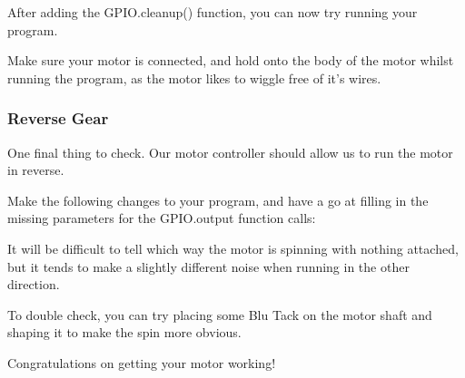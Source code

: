		
		
		After adding the GPIO.cleanup() function, you can now try running your program.
		
		Make sure your motor is connected, and hold onto the body of the motor whilst running the program, as the motor likes to wiggle free of it's wires.
		
		\subsubsection*{Reverse Gear}
		
			One final thing to check. Our motor controller should allow us to run the motor in reverse. 
			
			Make the following changes to your program, and have a go at filling in the missing parameters for the GPIO.output function calls:
					
			
			
			It will be difficult to tell which way the motor is spinning with nothing attached, but it tends to make a slightly different noise when running in the other direction.
			
			To double check, you can try placing some Blu Tack on the motor shaft and shaping it to make the spin more obvious.
			
			Congratulations on getting your motor working!
			